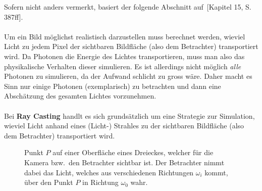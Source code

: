 Sofern nicht anders vermerkt, basiert der folgende Abschnitt
auf~\cite{hughes_computer_2013}[Kapitel 15, S. 387ff].\\
\\
Um ein Bild möglichst realistisch darzustellen muss berechnet werden, wieviel
Licht zu jedem Pixel der sichtbaren Bildfläche (also dem Betrachter)
transportiert wird. Da Photonen die Energie des Lichtes transportieren, muss
man also das physikalische Verhalten dieser simulieren. Es ist allerdings nicht
möglich \textit{alle} Photonen zu simulieren, da der Aufwand schlicht zu gross
wäre. Daher macht es Sinn nur einige Photonen (exemplarisch) zu betrachten und
dann eine Abschätzung des gesamten Lichtes vorzunehmen.\\
\\
Bei \textbf{Ray Casting} handlt es sich grundsätzlich um eine Strategie zur
Simulation, wieviel Licht anhand eines (Licht-) Strahles zu der sichtbaren
Bildfläche (also dem Betrachter) transportiert wird.

\begin{figure}[H]
    \centering {}
    \caption{Punkt $P$ auf einer Oberfläche eines Dreieckes, welcher für die Kamera bzw.\ den Betrachter sichtbar ist.
        Der Betrachter nimmt dabei das Licht, welches aus verschiedenen Richtungen $\omega_{i}$ kommt, über den Punkt $P$ in Richtung $\omega_{0}$ wahr.\label{fig:ray_casting:basics}\protect\footnotemark}
\end{figure}

